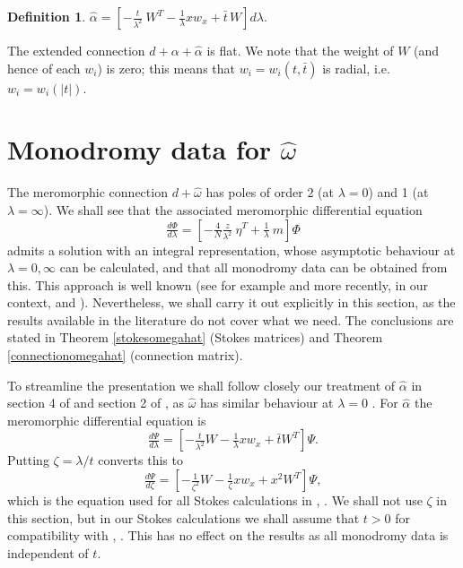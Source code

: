 \documentclass[a4paper,12pt,leqno]{amsart}
\numberwithin{equation}{section}
\theoremstyle{plain}
\newtheorem{definition}[theorem]{Definition}
\theoremstyle{definition}
\newcommand{\al}{\alpha}
\newcommand{\la}{\lambda}
\newcommand{\om}{\omega}
\newcommand{\ze}{\zeta}
\newcommand{\tbar}{  {\bar t}  }
\newcommand{\nn}{m}
\begin{document}
\begin{definition}\label{hatalpha}  
$
\hat\al=
\left[
- \tfrac{t}{\la^2}
\ W^T
- \tfrac1\la xw_x + \tbar \,W
\right]
d\la.
$
\end{definition}
The extended connection $d+\al+\hat\al$ is flat.  We note that the weight of $W$ (and hence of each $w_i$) is zero; this means that $w_i=w_i(t,\bar t)$ is radial, i.e.\ 
$w_i=w_i(\vert t\vert)$.


\section{Monodromy data for $\hat\om$}\label{omegahat}

The meromorphic connection $d+\hat\om$ has poles of order $2$ (at $\la=0$) and 1 (at $\la=\infty$).  We shall see that the associated meromorphic differential equation
\begin{equation}\label{phiode}
\tfrac{d\Phi}{d\la}=
\left[
-\tfrac4N \tfrac{z}{\la^2}
\ \eta^T
+\tfrac1\la
\ \nn
\right]
\Phi
\end{equation}
admits a solution with an integral representation, whose asymptotic behaviour at $\la=0,\infty$ can be calculated, and that all monodromy data can be obtained from this.  
This approach is well known (see for example \cite{BaJuLu79} and more recently, in our context, 
\cite{Du96} and \cite{Gu99}).  Nevertheless, we shall carry it out explicitly in this section, as the results available in the literature do not cover what we need.  The conclusions are stated in Theorem \ref{stokesomegahat} (Stokes matrices) and Theorem  \ref{connectionomegahat} (connection matrix). 

To streamline the presentation we shall follow closely our treatment of $\hat\al$ in section 4 of \cite{GuItLiXX} and
section 2 of \cite{GuItLi15}, as $\hat\om$ has similar behaviour at $\la=0$ .  For $\hat\al$ the meromorphic differential equation
is
\begin{equation}\label{psiode}
\tfrac{d\Psi}{d\la}=
\left[
-\tfrac{t}{\la^2} W - \tfrac{1}{\la} xw_x + \tbar W^T
\right]
\Psi.
\end{equation}
Putting $\ze=\la/t$ converts this to
\begin{equation}\label{psiodezeta}
\tfrac{d\Psi}{d\ze}=
\left[
-\tfrac{1}{\ze^2} W - \tfrac{1}{\ze} xw_x + x^2 W^T
\right]
\Psi,
\end{equation}
which is the equation used for all Stokes calculations in \cite{GuItLiXX}, \cite{GuItLi15}. We shall not use $\ze$ in this section, but in our Stokes calculations we shall assume that $t>0$ for compatibility with \cite{GuItLiXX}, \cite{GuItLi15}. This has no effect on the results as all monodromy data is independent of $t$.  
\end{document}
